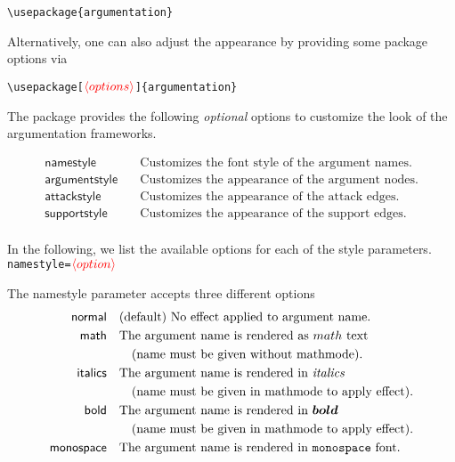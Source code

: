 \documentclass{article}
\newcommand{\opt}[2][red]{\ensuremath{\textcolor{#1}{\langle #2\rangle}}}
\begin{document}
    \noindent
    \verb|\usepackage{argumentation}|

    Alternatively, one can also adjust the appearance by providing some package options via

    \noindent
    \verb|\usepackage[|\opt{options}\verb|]{argumentation}|
    
    \begin{list}{}{\leftmargin=\parindent\rightmargin=0pt}
        \item The package provides the following \emph{optional} options to customize the look of the argumentation frameworks.
    \end{list}
    \begin{align*}
        \mathsf{namestyle} &\quad \text{Customizes the font style of the argument names.}\\
        \mathsf{argumentstyle} &\quad \text{Customizes the appearance of the argument nodes.}\\
        \mathsf{attackstyle} &\quad \text{Customizes the appearance of the attack edges.}\\
        \mathsf{supportstyle} &\quad \text{Customizes the appearance of the support edges.}\\
    \end{align*}

    In the following, we list the available options for each of the style parameters.\\

\noindent\texttt{namestyle=}\opt{option}
    
    The \textsf{namestyle} parameter accepts three different options
    \begin{align*}
        \mathsf{normal} &\quad \text{(default) No effect applied to argument name.}\\
        \mathsf{math} &\quad \text{The argument name is rendered as $math$ text}\\
        &\quad\quad \text{(name must be given without mathmode).}\\
        \mathsf{italics} &\quad \text{The argument name is rendered in \textit{italics}}\\
        &\quad\quad \text{(name must be given in mathmode to apply effect).}\\
        \mathsf{bold} &\quad \text{The argument name is rendered in $\boldsymbol{bold}$}\\
        &\quad\quad \text{(name must be given in mathmode to apply effect).}\\
        \mathsf{monospace} &\quad \text{The argument name is rendered in \texttt{monospace} font.}\\
    \end{align*}
\end{document}
